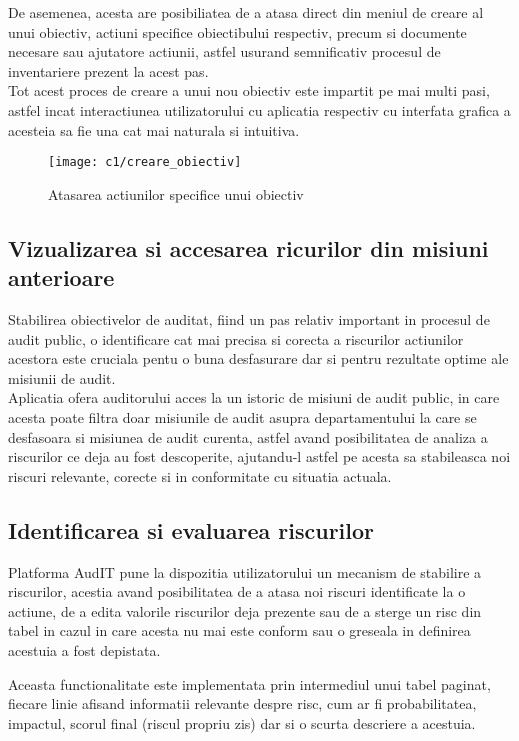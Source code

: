 De asemenea, acesta are posibiliatea de a atasa direct din meniul de creare al unui obiectiv, actiuni specifice obiectibului respectiv, precum si documente necesare sau ajutatore actiunii, astfel usurand semnificativ procesul de inventariere prezent la acest pas.\\
Tot acest proces  de creare a unui nou obiectiv este impartit pe mai multi pasi, astfel incat interactiunea utilizatorului cu aplicatia respectiv cu interfata grafica a acesteia sa fie una cat mai naturala si intuitiva.
\vspace{1cm}
\begin{figure}[h]
	\centering
	
	\texttt{[image: c1/creare\_obiectiv]}
	\caption{Atasarea actiunilor specifice unui obiectiv}
\end{figure}

\subsection{Vizualizarea si accesarea ricurilor din misiuni anterioare}
Stabilirea obiectivelor de auditat, fiind un pas relativ important in procesul de audit public, o identificare cat mai precisa si corecta a riscurilor actiunilor acestora este cruciala pentu o buna desfasurare dar si pentru rezultate optime ale misiunii de audit.\\
Aplicatia ofera auditorului acces la un istoric de misiuni de audit public, in care acesta poate filtra doar misiunile de audit asupra departamentului la care se desfasoara si misiunea de audit curenta, astfel avand posibilitatea de analiza a riscurilor ce deja au fost descoperite, ajutandu-l 
astfel pe acesta sa stabileasca noi riscuri relevante, corecte si in conformitate cu situatia actuala.

\subsection{Identificarea si evaluarea riscurilor}
Platforma AudIT pune la dispozitia utilizatorului un mecanism de stabilire a riscurilor, acestia avand posibilitatea de a atasa noi riscuri identificate la o actiune, de a edita valorile riscurilor deja prezente sau de a sterge un risc din tabel in cazul in care acesta nu mai este conform sau o greseala in definirea acestuia a fost depistata.

Aceasta functionalitate este implementata prin intermediul unui tabel paginat, fiecare linie afisand informatii relevante despre risc, cum ar fi probabilitatea, impactul, scorul final (riscul propriu zis) dar si o scurta descriere a acestuia.

